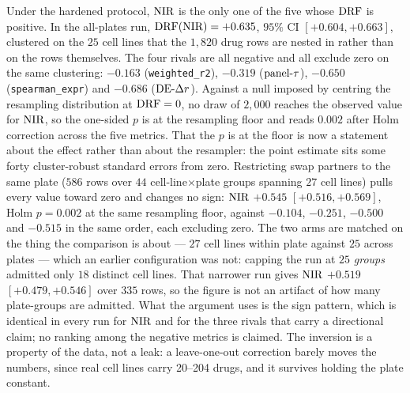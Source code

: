 Under the hardened protocol, $\textrm{NIR}$ is the only one of the five whose $\textrm{DRF}$ is positive. In the
all-plates run, $\textrm{DRF}(\textrm{NIR}) = +0.635$, $95\%$ CI $[+0.604, +0.663]$, clustered on the $25$ cell
lines that the $1{,}820$ drug rows are nested in rather than on the rows themselves. The four rivals
are all negative and all exclude zero on the same clustering: $-0.163$ (\texttt{weighted\_r2}),
$-0.319$ ($\textrm{panel-}\tau$), $-0.650$ (\texttt{spearman\_expr}) and $-0.686$ ($\textrm{DE-}\Delta r$). Against a null
imposed by centring the resampling distribution at $\textrm{DRF} = 0$, no draw of $2{,}000$ reaches the
observed value for $\textrm{NIR}$, so the one-sided $p$ is at the resampling floor and reads $0.002$ after
Holm correction across the five metrics. That the $p$ is at the floor is now a statement about the
effect rather than about the resampler: the point estimate sits some forty cluster-robust standard
errors from zero. Restricting swap partners to the same plate ($586$ rows over $44$
cell-line$\times$plate groups spanning $27$ cell lines) pulls every value toward zero and changes no
sign: $\textrm{NIR}$ $+0.545$ $[+0.516, +0.569]$, Holm $p = 0.002$ at the same resampling floor, against
$-0.104$, $-0.251$, $-0.500$ and $-0.515$ in the same order, each excluding zero. The two arms are matched on the thing the comparison is about ---
$27$ cell lines within plate against $25$ across plates --- which an earlier configuration was not:
capping the run at $25$ \emph{groups} admitted only $18$ distinct cell lines. That narrower run gives
$\textrm{NIR}$ $+0.519$ $[+0.479, +0.546]$ over $335$ rows, so the figure is not an artifact of how many
plate-groups are admitted. What the argument uses is the sign pattern, which is identical in every
run for $\textrm{NIR}$ and for the three rivals that carry a directional claim; no ranking among the
negative metrics is claimed. The inversion is a
property of the data, not a leak: a leave-one-out correction barely moves the numbers, since real
cell lines carry 20--204 drugs, and it survives holding the plate constant.

